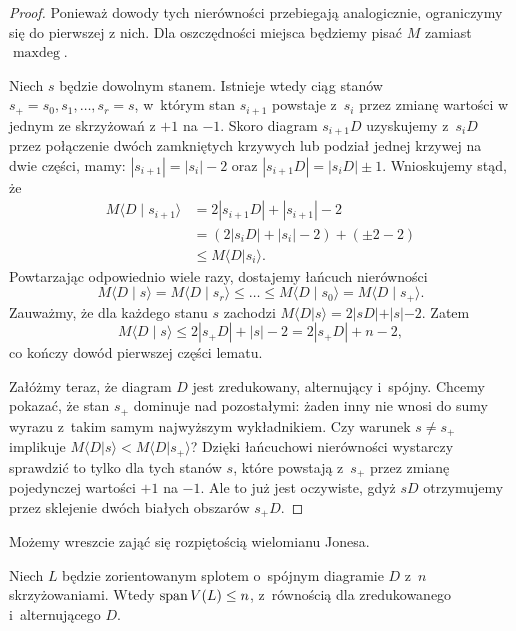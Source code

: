 \begin{proof}
    Ponieważ dowody tych nierówności przebiegają analogicznie, ograniczymy się do pierwszej z nich.
    Dla oszczędności miejsca będziemy pisać $M$ zamiast $\operatorname{maxdeg}$.

    Niech $s$ będzie dowolnym stanem.
    Istnieje wtedy ciąg stanów $s_+ = s_0, s_1, \ldots, s_r = s$, w~którym stan $s_{i+1}$ powstaje z~$s_i$ przez zmianę wartości w jednym ze skrzyżowań z $+1$ na $-1$.
    Skoro diagram $s_{i+1}D$ uzyskujemy z~$s_{i}D$ przez połączenie dwóch zamkniętych krzywych lub podział jednej krzywej na dwie części, mamy: $|s_{i+1}| = |s_i| - 2$ oraz $|s_{i+1}D| = |s_iD| \pm 1$.
    Wnioskujemy stąd, że
    \begin{align}
        M \langle D \mid s_{i+1} \rangle
        & = 2|s_{i+1}D| + |s_{i+1}|-2 \\
        & = (2|s_iD| + |s_i| -2 ) + (\pm 2-2) \\
        & \le M \langle D|s_i\rangle.
    \end{align}
    Powtarzając odpowiednio wiele razy, dostajemy łańcuch nierówności
    \begin{equation}
        M \langle D \mid s \rangle
        =
        M \langle D \mid s_r \rangle
        \le \ldots \le
        M \langle D \mid s_0 \rangle
        =
        M \langle D \mid s_+ \rangle.
    \end{equation}
    Zauważmy, że dla każdego stanu $s$ zachodzi $M \langle D|s \rangle = 2|sD| + |s| - 2$.
    Zatem
    \begin{equation}
        M \langle D \mid s \rangle \le 2 |s_+D| + |s| - 2 = 2|s_+D| + n - 2,
    \end{equation}
    co kończy dowód pierwszej części lematu.

    Załóżmy teraz, że diagram $D$ jest zredukowany, alternujący i~spójny.
    Chcemy pokazać, że stan $s_+$ dominuje nad pozostałymi: żaden inny nie wnosi do sumy wyrazu z~takim samym najwyższym wykładnikiem.
    Czy warunek $s \neq s_+$ implikuje $M\langle D|s\rangle < M\langle D| s_+\rangle$?
    Dzięki łańcuchowi nierówności wystarczy sprawdzić to tylko dla tych stanów $s$, które powstają z~$s_+$ przez zmianę pojedynczej wartości $+1$ na $-1$.
    Ale to już jest oczywiste, gdyż $sD$ otrzymujemy przez sklejenie dwóch białych obszarów $s_+ D$.
\end{proof}

Możemy wreszcie zająć się rozpiętością wielomianu Jonesa.

\begin{proposition}
    Niech $L$ będzie zorientowanym splotem o~spójnym diagramie $D$ z~$n$ skrzyżowaniami.
    Wtedy $\operatorname{span} V(L) \le n$, z~równością dla zredukowanego i~alternującego $D$.
\end{proposition}

